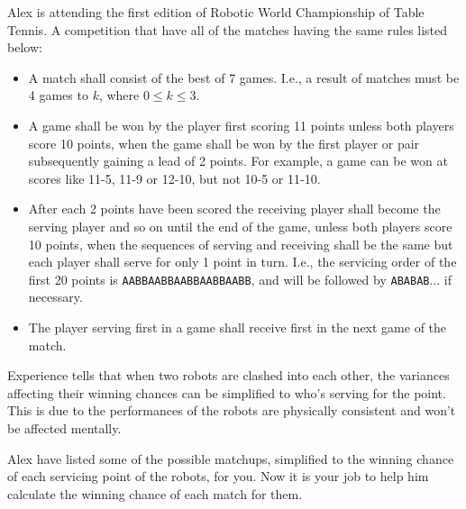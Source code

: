 Alex is attending the first edition of Robotic World Championship of Table 
Tennis. 
A competition that have all of the matches having the same rules listed below:

\begin{itemize}
\tightlist
\item A match shall consist of the best of 7 games.
      I.e., a result of matches must be 4 games to $k$, where $0 \leq k \leq 3$.
\item A game shall be won by the player first scoring 11 points unless both 
      players score 10 points, when the game shall be won by the first player 
      or pair subsequently gaining a lead of 2 points.
      For example, a game can be won at scores like 11-5, 11-9 or 12-10, 
      but not 10-5 or 11-10.
\item After each 2 points have been scored the receiving player shall become 
      the serving player and so on until the end of the game, unless both 
      players score 10 points, when the sequences of serving and receiving 
      shall be the same but each player shall serve for only 1 point in turn. 
      I.e., the servicing order of the first 20 points is 
      \verb+AABBAABBAABBAABBAABB+, and will be followed by \verb+ABABAB+$\ldots$
      if necessary.
\item The player serving first in a game shall receive first in the next game 
      of the match.
\end{itemize}

Experience tells that when two robots are clashed into each other, 
the variances affecting their winning chances can be simplified to 
who's serving for the point. This is due to the performances of the 
robots are physically consistent and won't be affected mentally.

Alex have listed some of the possible matchups, simplified to the winning 
chance of each servicing point of the robots, for you. Now it is your job to 
help him calculate the winning chance of each match for them.
